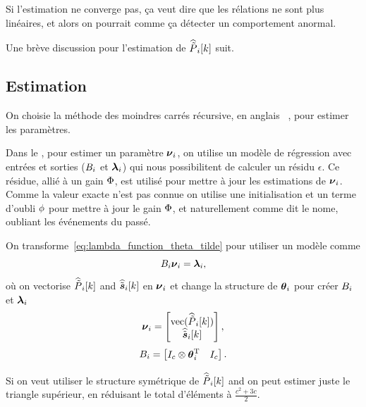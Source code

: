 \documentclass[../main.tex]{subfiles}
\begin{document}
\begin{remark}
  Si l'estimation ne converge pas, ça veut dire que les rélations ne sont plus linéaires, et alors on pourrait comme ça détecter un comportement anormal.
\end{remark}

Une brève discussion pour l'estimation de $\widehat{\tilde{P}}_{i}[k]$ suit.

\subsection{Estimation}\label{sec:about-estimation_fr}
On choisie la méthode des moindres carrés récursive, en anglais \RLS{}~\cite{AstroemWittenmark1989}, pour estimer les paramètres.

Dans le \RLS{}, pour estimer un paramètre ${\boldsymbol{\nu}_{i}}$, on utilise un modèle de régression avec entrées et sorties (${B_i}$ et ${\boldsymbol{\lambda}_{i}}$) qui nous possibilitent de calculer un résidu $\epsilon$.
Ce résidue, allié à un gain ${\Phi}$, est utilisé pour mettre à jour les estimations de ${\boldsymbol{\nu}_{i}}$.
Comme la valeur exacte n'est pas connue on utilise une initialisation et un terme d'oubli ${\phi}$ pour mettre à jour le gain ${\Phi}$, et naturellement comme dit le nome, oubliant les événements du passé.

On transforme~\eqref{eq:lambda_function_theta_tilde} pour utiliser un modèle comme
\begin{equation}
  {B_i}{\boldsymbol{\nu}_{i}}={\boldsymbol{\lambda}_{i}},
\end{equation}
où on vectorise $\widehat{\tilde{P}}_{i}[k]$ and $\widehat{\tilde{\boldsymbol{s}}}_{i}[k]$ en ${\boldsymbol{\nu}_{i}}$ et change la structure de $\boldsymbol{\theta}_{i}$ pour créer ${B_i}$ et ${\boldsymbol{\lambda}_{i}}$
\begin{equation}
  {\boldsymbol{\nu}_{i}}=\left[
    \begin{matrix}
      \mathrm{vec} (\widehat{\tilde{P}}_{i}[k])\\
      \widehat{\tilde{\boldsymbol{s}}}_{i}[k]\\
    \end{matrix}
  \right],
\end{equation}
\begin{equation}
  {B_i}=\left[
    \begin{matrix}
      I_{c}\otimes\boldsymbol{\theta}_{i}^{\mathrm{T}}&I_{c}\\
    \end{matrix}
  \right].
\end{equation}

Si on veut utiliser le structure symétrique de $\widehat{\tilde{P}}_{i}[k]$ and on peut estimer juste le triangle supérieur, en réduisant le total d'éléments à ${\frac{c^{2}+3c}{2}}$.
\end{document}
